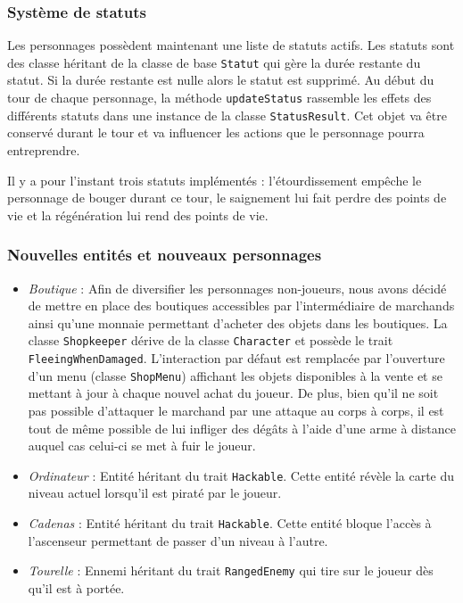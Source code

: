 \documentclass[10pt,a4paper]{article}
\begin{document}
\subsubsection{Système de statuts}
Les personnages possèdent maintenant une liste de statuts actifs. Les statuts sont des classe héritant de la classe de base \texttt{Statut} qui gère la durée restante du statut. Si la durée restante est nulle alors le statut est supprimé. Au début du tour de chaque personnage, la méthode \texttt{updateStatus} rassemble les effets des différents statuts dans une instance de la classe \texttt{StatusResult}. Cet objet va être conservé durant le tour et va influencer les actions que le personnage pourra entreprendre.

Il y a pour l'instant trois statuts implémentés : l'étourdissement empêche le personnage de bouger durant ce tour, le saignement lui fait perdre des points de vie et la régénération lui rend des points de vie.

\subsubsection{Nouvelles entités et nouveaux personnages}
\begin{itemize}
    \item \emph{Boutique} : Afin de diversifier les personnages non-joueurs, nous avons décidé de mettre en place des boutiques accessibles par l'intermédiaire de marchands ainsi qu'une monnaie permettant d'acheter des objets dans les boutiques. La classe \texttt{Shopkeeper} dérive de la classe \texttt{Character} et possède le trait \texttt{FleeingWhenDamaged}. L'interaction par défaut est remplacée par l'ouverture d'un menu (classe \texttt{ShopMenu}) affichant les objets disponibles à la vente et se mettant à jour à chaque nouvel achat du joueur. De plus, bien qu'il ne soit pas possible d'attaquer le marchand par une attaque au corps à corps, il est tout de même possible de lui infliger des dégâts à l'aide d'une arme à distance auquel cas celui-ci se met à fuir le joueur.
    \item \emph{Ordinateur} : Entité héritant du trait \texttt{Hackable}. Cette entité révèle la carte du niveau actuel lorsqu'il est piraté par le joueur.
    \item \emph{Cadenas} : Entité héritant du trait \texttt{Hackable}. Cette entité bloque l'accès à l'ascenseur permettant de passer d'un niveau à l'autre.
    \item \emph{Tourelle} : Ennemi héritant du trait \texttt{RangedEnemy} qui tire sur le joueur dès qu'il est à portée.
\end{itemize}
\end{document}
